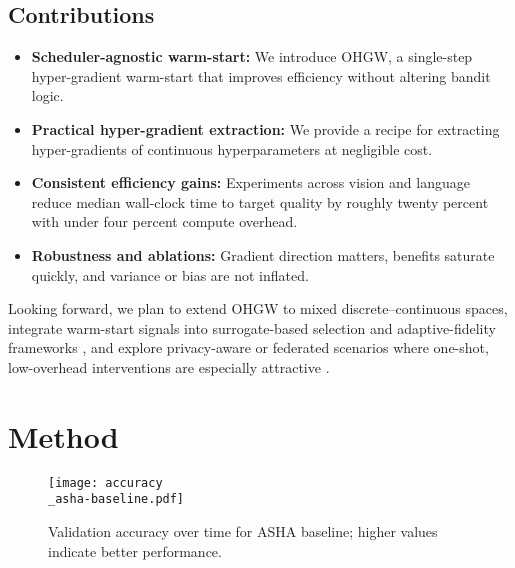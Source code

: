 \documentclass{article}
\begin{document}
\subsection{Contributions}
\begin{itemize}
    \item \textbf{Scheduler-agnostic warm-start:} We introduce OHGW, a single-step hyper-gradient warm-start that improves efficiency without altering bandit logic.
    \item \textbf{Practical hyper-gradient extraction:} We provide a recipe for extracting hyper-gradients of continuous hyperparameters at negligible cost.
    \item \textbf{Consistent efficiency gains:} Experiments across vision and language reduce median wall-clock time to target quality by roughly twenty percent with under four percent compute overhead.
    \item \textbf{Robustness and ablations:} Gradient direction matters, benefits saturate quickly, and variance or bias are not inflated.
\end{itemize}

Looking forward, we plan to extend OHGW to mixed discrete–continuous spaces, integrate warm-start signals into surrogate-based selection \cite{khazi-2023-deep} and adaptive-fidelity frameworks \cite{jiang-2024-efficient}, and explore privacy-aware or federated scenarios where one-shot, low-overhead interventions are especially attractive \cite{panda-2022-new,khodak-2021-federated}.


\section{Method}

\begin{figure}[H]
    \centering
    \texttt{[image: accuracy\\\_asha-baseline.pdf]}
    \caption{Validation accuracy over time for ASHA baseline; higher values indicate better performance.}
\end{figure}
\end{document}
